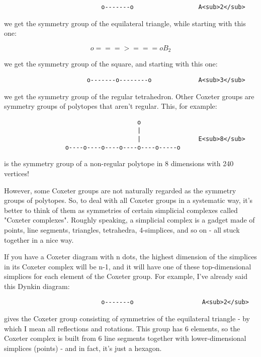 \begin{verbatim}
                           o-------o                  A<sub>2</sub>
\end{verbatim}
    
we get the symmetry group of the equilateral triangle, while starting
with this one:

$$
                           o===>===o                  B_{2}
$$
    
we get the symmetry group of the square, and starting with this one:


\begin{verbatim}
                       o-------o--------o             A<sub>3</sub>
\end{verbatim}
    
we get the symmetry group of the regular tetrahedron.  Other Coxeter
groups are symmetry groups of polytopes that aren't regular.   This, 
for example:

\begin{verbatim}
                                     o
                                     | 
                                     |                E<sub>8</sub>
                 o----o----o----o----o----o-----o
\end{verbatim}
    
is the symmetry group of a non-regular polytope in 8 dimensions with 240 
vertices!   

However, some Coxeter groups are not naturally regarded as the symmetry
groups of polytopes.  So, to deal with all Coxeter groups in a
systematic way, it's better to think of them as symmetries of certain
simplicial complexes called "Coxeter complexes".  Roughly speaking, a
simplicial complex is a gadget made of points, line segments, triangles,
tetrahedra, 4-simplices, and so on - all stuck together in a nice way.

If you have a Coxeter diagram with n dots, the highest dimension of  the
simplices in its Coxeter complex will be n-1, and it will have one of
these top-dimensional simplices for each element of the Coxeter group. 
For example, I've already said this Dynkin diagram:  

\begin{verbatim}
                           o-------o                   A<sub>2</sub>
\end{verbatim}
    
gives the Coxeter group consisting of symmetries of the equilateral
triangle - by which I mean all reflections and rotations.  This group
has 6 elements, so the Coxeter complex is built from 6 line segments
together with lower-dimensional simplices (points) - and in fact, it's 
just a hexagon.    

